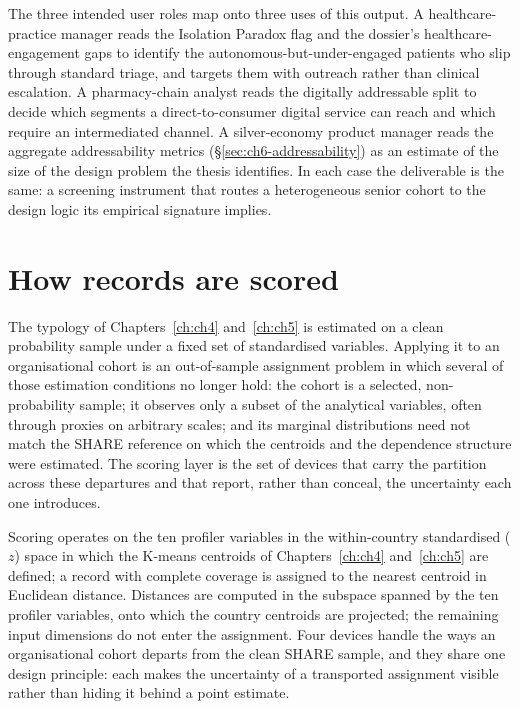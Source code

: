 %
The three intended user roles map onto three uses of this output. A healthcare-practice manager reads the Isolation Paradox flag and the dossier's healthcare-engagement gaps to identify the autonomous-but-under-engaged patients who slip through standard triage, and targets them with outreach rather than clinical escalation. A pharmacy-chain analyst reads the digitally addressable split to decide which segments a direct-to-consumer digital service can reach and which require an intermediated channel. A silver-economy product manager reads the aggregate addressability metrics (\S\ref{sec:ch6-addressability}) as an estimate of the size of the design problem the thesis identifies. In each case the deliverable is the same: a screening instrument that routes a heterogeneous senior cohort to the design logic its empirical signature implies.

\section{How records are scored}
\label{sec:atlas-scoring}

The typology of Chapters~\ref{ch:ch4} and~\ref{ch:ch5} is estimated on a clean probability sample under a fixed set of standardised variables. Applying it to an organisational cohort is an out-of-sample assignment problem in which several of those estimation conditions no longer hold: the cohort is a selected, non-probability sample; it observes only a subset of the analytical variables, often through proxies on arbitrary scales; and its marginal distributions need not match the SHARE reference on which the centroids and the dependence structure were estimated. The scoring layer is the set of devices that carry the partition across these departures and that report, rather than conceal, the uncertainty each one introduces.

Scoring operates on the ten profiler variables in the within-country standardised ($z$) space in which the K-means centroids of Chapters~\ref{ch:ch4} and~\ref{ch:ch5} are defined; a record with complete coverage is assigned to the nearest centroid in Euclidean distance. Distances are computed in the subspace spanned by the ten profiler variables, onto which the country centroids are projected; the remaining input dimensions do not enter the assignment. Four devices handle the ways an organisational cohort departs from the clean SHARE sample, and they share one design principle: each makes the uncertainty of a transported assignment visible rather than hiding it behind a point estimate.


